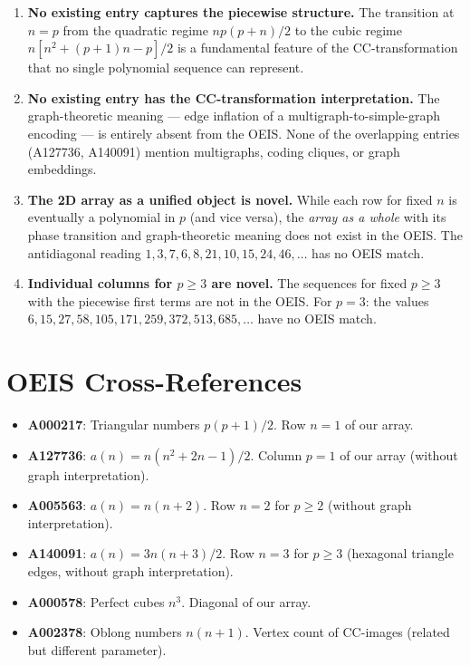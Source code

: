\documentclass[11pt,a4paper]{article}
\theoremstyle{definition}
\begin{document}
\begin{enumerate}
\item \textbf{No existing entry captures the piecewise structure.} The transition at $n = p$ from the quadratic regime $np(p+n)/2$ to the cubic regime $n[n^2 + (p+1)n - p]/2$ is a fundamental feature of the CC-transformation that no single polynomial sequence can represent.

\item \textbf{No existing entry has the CC-transformation interpretation.} The graph-theoretic meaning --- edge inflation of a multigraph-to-simple-graph encoding --- is entirely absent from the OEIS. None of the overlapping entries (A127736, A140091) mention multigraphs, coding cliques, or graph embeddings.

\item \textbf{The 2D array as a unified object is novel.} While each row for fixed $n$ is eventually a polynomial in $p$ (and vice versa), the \emph{array as a whole} with its phase transition and graph-theoretic meaning does not exist in the OEIS. The antidiagonal reading $1, 3, 7, 6, 8, 21, 10, 15, 24, 46, \ldots$ has no OEIS match.

\item \textbf{Individual columns for $p \geq 3$ are novel.} The sequences for fixed $p \geq 3$ with the piecewise first terms are not in the OEIS. For $p = 3$: the values $6, 15, 27, 58, 105, 171, 259, 372, 513, 685, \ldots$ have no OEIS match.
\end{enumerate}

\section{OEIS Cross-References}

\begin{itemize}
\item \textbf{A000217}: Triangular numbers $p(p+1)/2$. Row $n = 1$ of our array.
\item \textbf{A127736}: $a(n) = n(n^2 + 2n - 1)/2$. Column $p = 1$ of our array (without graph interpretation).
\item \textbf{A005563}: $a(n) = n(n+2)$. Row $n = 2$ for $p \geq 2$ (without graph interpretation).
\item \textbf{A140091}: $a(n) = 3n(n+3)/2$. Row $n = 3$ for $p \geq 3$ (hexagonal triangle edges, without graph interpretation).
\item \textbf{A000578}: Perfect cubes $n^3$. Diagonal of our array.
\item \textbf{A002378}: Oblong numbers $n(n+1)$. Vertex count of CC-images (related but different parameter).
\end{itemize}
\end{document}
